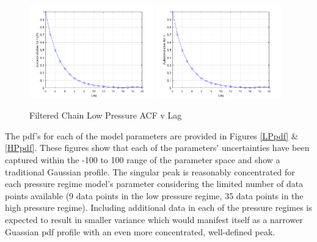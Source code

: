 \documentclass{article}
\begin{document}
\begin{figure}[htb!]
\centering
\includegraphics[width=0.48\textwidth]{ACF_lnA_filt_LP.png}
\includegraphics[width=0.48\textwidth]{ACF_n_filt_LP.png}
\caption{Filtered Chain Low Pressure ACF v Lag}
\label{autoLP}
\end{figure}

The pdf's for each of the model parameters are provided in Figures \ref{LPpdf} \& \ref{HPpdf}. These figures show that each of 
the parameters' uncertainties have been captured within the -100 to 100 range of the parameter space and show 
a traditional Gaussian profile. The singular peak is reasonably concentrated for each pressure regime model's 
parameter considering the limited number of data points available (9 data points in the low pressure regime, 
35 data points in the high pressure regime). Including additional data in each of the pressure regimes
is expected to result in smaller variance which would manifest itself as a narrower Guassian pdf profile with an even
more concentrated, well-defined peak.
\end{document}
